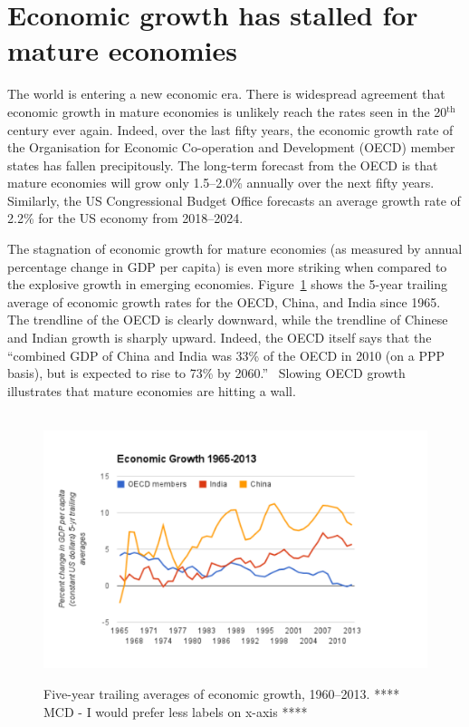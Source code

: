 \section{Economic growth has stalled for mature economies} %
\label{sec:growth_has_slowed}

The world is entering a new economic era. 
There is widespread agreement that economic growth in mature economies 
is unlikely reach the rates seen in the 20$^\mathrm{th}$ century ever again.  
Indeed, over the last fifty years, 
the economic growth rate of the 
Organisation for Economic Co-operation and Development (OECD) 
member states has fallen precipitously. 
The long-term forecast from the OECD is that mature economies 
will grow only 1.5--2.0\% annually over the next fifty years. 
Similarly, the US Congressional Budget Office forecasts 
an average growth rate of 2.2\% for the US economy 
from 2018--2024.\cite{OECD2014,CBO2014}

The stagnation of economic growth for mature economies 
(as measured by annual percentage change in GDP per capita) 
is even more striking 
when compared to the explosive growth in emerging economies. 
Figure~\ref{fig:gdppc} shows the 5-year trailing average 
of economic growth rates for the OECD, China, and India since 1965. 
The trendline of the OECD is clearly downward, 
while the trendline of Chinese and Indian growth is sharply upward.  
Indeed, the OECD itself says that the 
``combined GDP of China and India was 33\% of the OECD in 2010 
(on a PPP basis), 
but is expected to rise to 73\% by 2060.''~\cite[p. 214]{OECD2014} 
Slowing OECD growth illustrates that mature economies are hitting a wall.

\begin{figure}
\centering\
\includegraphics[width=\linewidth]{Part_0/Chapter_Introduction/images/GDPPC1.pdf}
\caption[Economic growth, 1960--2013]{Five-year trailing averages of economic growth, 
1960--2013.\cite{WorldBank2014}
**** MCD - I would prefer less labels on x-axis ****}
\label{fig:gdppc}
\end{figure}

